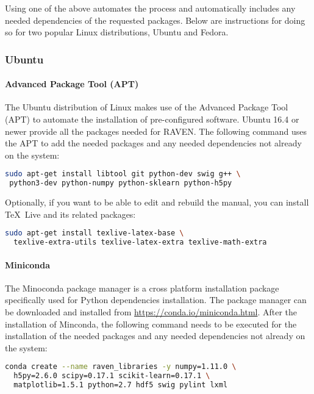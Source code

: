 Using one of the above automates the process and automatically includes any needed
dependencies of the requested packages.  Below are instructions for
doing so for two popular Linux distributions, Ubuntu and Fedora.  

\subsubsection{Ubuntu}

\paragraph{Advanced Package Tool (APT)}

The Ubuntu distribution of Linux makes use of the Advanced Package
Tool (APT) to automate the installation of pre-configured software.
Ubuntu 16.4 or newer provide all the packages needed for RAVEN.  The
following command uses the APT to add the needed packages and any
needed dependencies not already on the system:

\begin{lstlisting}[language=bash]
 sudo apt-get install libtool git python-dev swig g++ \
 python3-dev python-numpy python-sklearn python-h5py
\end{lstlisting}

Optionally, if you want to be able to edit and rebuild the manual, you can
install \TeX~Live and its related packages:
\begin{lstlisting}[language=bash]
  sudo apt-get install texlive-latex-base \
  texlive-extra-utils texlive-latex-extra texlive-math-extra
\end{lstlisting}

\paragraph{Miniconda}

The Minoconda package manager is a cross platform installation package specifically 
used for Python dependencies installation.
The package manager can be downloaded and installed from \url{https://conda.io/miniconda.html}.
After the installation of Minconda, the following command needs to be executed for the installation of
the needed packages and any needed dependencies not already on the system:

\begin{lstlisting}[language=bash]
 conda create --name raven_libraries -y numpy=1.11.0 \
  h5py=2.6.0 scipy=0.17.1 scikit-learn=0.17.1 \
  matplotlib=1.5.1 python=2.7 hdf5 swig pylint lxml
\end{lstlisting}

